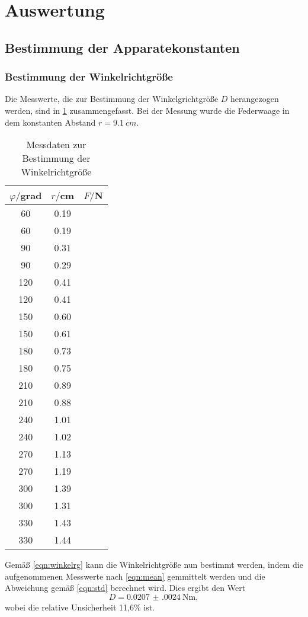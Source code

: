 \section{Auswertung}
\subsection{Bestimmung der Apparatekonstanten}
\subsubsection{Bestimmung der Winkelrichtgröße}
Die Messwerte, die zur Bestimmung der Winkelgrichtgröße $D$ herangezogen werden,
sind in \ref{tab:winkelrichtgroesse} zusammengefasst. Bei der Messung wurde die
Federwaage in dem konstanten Abstand $r=\SI{9.1}{cm}$.
\begin{table}
\centering
\caption{Messdaten zur Bestimmung der Winkelrichtgröße}
\label{tab:winkelrichtgroesse}
\begin{tabular}{c c c}
\toprule
$\varphi/$grad & $r/$cm & $F/$N \\
\midrule
 60	& 0.19 \\
 60	& 0.19 \\
 90	& 0.31 \\
 90	& 0.29 \\
120 &	0.41 \\
120 &	0.41 \\
150 &	0.60 \\
150 &	0.61 \\
180 &	0.73 \\
180 &	0.75 \\
210 &	0.89 \\
210 &	0.88 \\
240 &	1.01 \\
240 &	1.02 \\
270 &	1.13 \\
270 &	1.19 \\
300 &	1.39 \\
300 &	1.31 \\
330 &	1.43 \\
330 &	1.44 \\
\bottomrule
\end{tabular}
\end{table}
Gemäß \eqref{eqn:winkelrg} kann die Winkelrichtgröße nun bestimmt werden, indem
die aufgenommenen Messwerte nach \eqref{eqn:mean} gemmittelt werden und die
Abweichung gemäß \eqref{eqn:std} berechnet wird. Dies ergibt den Wert
\begin{equation}
  D = \SI{0.0207(0024)}{\newton\meter},
\end{equation}
wobei die relative Unsicherheit 11,6\% ist.

